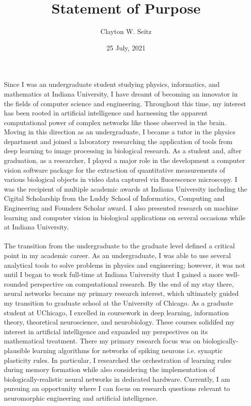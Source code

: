 \documentclass{article}
\title{Statement of Purpose}
\author{Clayton W. Seitz}
\date{25 July, 2021}
\begin{document}
  \maketitle%
\vspace{0.4in}

\indent Since I was an undergraduate student studying physics, informatics, and mathematics at Indiana University, I have dreamt of becoming an innovator in the fields of computer science and engineering. Throughout this time, my interest has been rooted in artificial intelligence and harnessing the apparent computational power of complex networks like those observed in the brain. Moving in this direction as an undergraduate, I became a tutor in the physics department and joined a laboratory researching the application of tools from deep learning to image processing in biological research. As a student and, after graduation, as a researcher, I played a major role in the development a computer vision software package for the extraction of quantitative measurements of various biological objects in video data captured via fluorescence microscopy. I was the recipient of multiple academic awards at Indiana University including the Cigital Scholarship from the Luddy School of Informatics, Computing and Engineering and Founders Scholar award. I also presented research on machine learning and computer vision in biological applications on several occasions while at Indiana University.\\
\\
\indent  The transition from the undergraduate to the graduate level defined a critical point in my academic career. As an undergraduate, I was able to use several analytical tools to solve problems in physics and engineering; however, it was not until I began to work full-time at Indiana University that I gained a more well-rounded perspective on computational research. By the end of my stay there, neural networks became my primary research interest, which ultimately guided my transition to graduate school at the University of Chicago. As a graduate student at UChicago, I excelled in coursework in deep learning, information theory, theoretical neuroscience, and neurobiology. These courses solidifed my interest in artificial intelligence and expanded my perspectives on its mathematical treatment. There my primary research focus was on biologically-plausible learning algorithms for networks of spiking neurons i.e. synaptic plasticity rules. In particular, I researched the orchestration of learning rules during memory formation while also considering the implementation of biologically-realistic neural networks in dedicated hardware. Currently, I am pursuing an opportunity where I can focus on research questions relevant to neuromorphic engineering and artificial intelligence.\\
\end{document}
